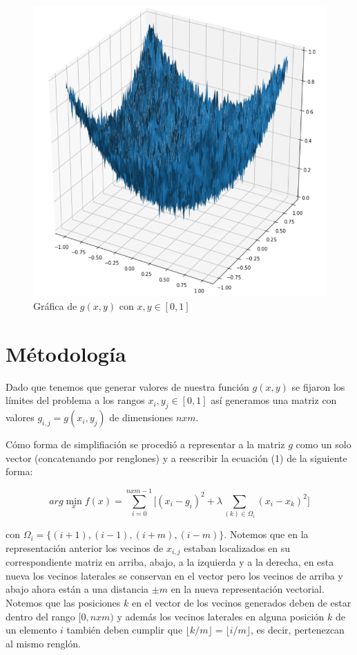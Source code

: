 \documentclass[conference]{IEEEtran}
\begin{document}
\begin{figure}[htbp]
    \centerline{\includegraphics[scale=0.3]{1.png}}
    \caption{Gráfica de $g(x, y)$ con $x,y \in [0,1]$}
    \label{img-1}
\end{figure}

\section{Métodología}

Dado que tenemos que generar valores de nuestra función $g(x, y)$ se fijaron los límites del
problema a los rangos $x_i, y_j \in [0,1]$ así generamos una matriz con valores
$g_{i,j} = g(x_i, y_j)$ de dimensiones $nxm$.

Cómo forma de simplifiación se procedió a representar a la matriz $g$ como un solo
vector (concatenando por renglones) y a reescribir la ecuación (1) de la siguiente forma:

\begin{equation}
	arg \min_{x} f(x) = \sum_{i=0}^{nxm-1} \Big[
		(x_{i} - g_{i})^2 + \lambda \sum_{(k) \in \Omega_{i}} (x_{i} - x_{k})^2
	\Big]
\end{equation}

con $\Omega_i = \{(i+1), (i-1), (i+m), (i-m)\}$. Notemos que en la representación anterior los
vecinos de $x_{i,j}$ estaban localizados en su correspondiente matriz en arriba, abajo, a la
izquierda y a la derecha, en esta nueva los vecinos laterales se conservan en el vector pero los
vecinos de arriba y abajo ahora están a una distancia $\pm m$ en la nueva representación vectorial.
Notemos que las posiciones $k$ en el vector de los vecinos generados deben de estar dentro del rango
$[0, nxm)$ y además los vecinos laterales en alguna posición $k$ de un elemento $i$ también deben
cumplir que $\lfloor k/m \rfloor = \lfloor i/m \rfloor$, es decir, pertenezcan al mismo renglón.
\end{document}
